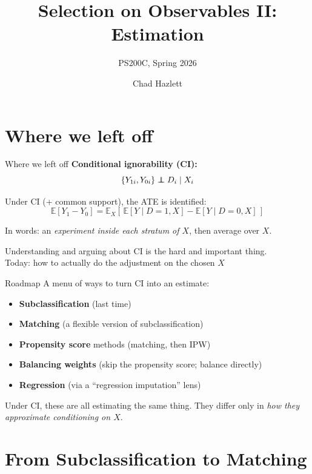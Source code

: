 \documentclass[xcolor=dvipsnames]{beamer}
\title[]{Selection on Observables II: Estimation}
\subtitle[ ]{PS200C, Spring 2026}
\author[Hazlett]{Chad Hazlett}
\institute[UCLA]{UCLA\\[1ex]
  \texttt{chazlett@ucla.edu}
}
\date{}
\newcommand\E{\mathbb{E}}
\newcommand\indep{\protect\mathpalette{\protect\independenT}{\perp}}
\def\independenT#1#2{\mathrel{\rlap{$#1#2$}\mkern2mu{#1#2}}}
\begin{document}
\begin{frame}
  \titlepage
\end{frame}


\section{Where we left off}

\begin{frame}{Where we left off}
\small
{} \textbf{Conditional ignorability (CI):}
$$\{Y_{1i}, Y_{0i}\} \indep D_i \mid X_i$$

\medskip
{} Under CI (+ common support), the ATE is identified:
$$\E[Y_1 - Y_0] = \E_X\!\left[\,\E[Y \mid D=1, X] - \E[Y \mid D=0, X]\,\right]$$

\bigskip
{} In words: an \emph{experiment inside each stratum of $X$}, then average over $X$.

\bigskip
{} Understanding and arguing about CI is the hard and important thing. \\
\bigskip
{} Today: how to actually do the adjustment on the chosen $X$ 
\end{frame}


\begin{frame}{Roadmap}
\small
{} A menu of ways to turn CI into an estimate:
\begin{itemize}
\item<2-> \textbf{Subclassification} (last time)
\item<3-> \textbf{Matching} (a flexible version of subclassification)
\item<4-> \textbf{Propensity score} methods (matching, then IPW)
\item<5-> \textbf{Balancing weights} (skip the propensity score; balance directly)
\item<6-> \textbf{Regression} (via a ``regression imputation'' lens)
\end{itemize}

\bigskip
{} Under CI, these are all estimating the same thing.  They differ only in \textit{how they approximate conditioning on $X$}.
\end{frame}


\section{From Subclassification to Matching}
\end{document}

